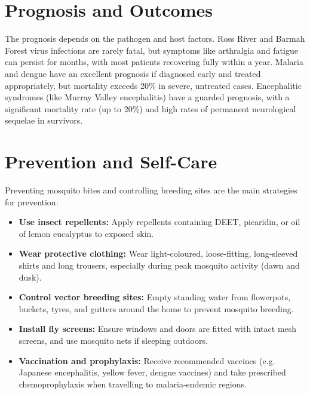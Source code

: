 \section*{Prognosis and Outcomes}
The prognosis depends on the pathogen and host factors. Ross River and Barmah Forest virus infections are rarely fatal, but symptoms like arthralgia and fatigue can persist for months, with most patients recovering fully within a year. Malaria and dengue have an excellent prognosis if diagnosed early and treated appropriately, but mortality exceeds 20\% in severe, untreated cases. Encephalitic syndromes (like Murray Valley encephalitis) have a guarded prognosis, with a significant mortality rate (up to 20\%) and high rates of permanent neurological sequelae in survivors.

\section*{Prevention and Self-Care}
Preventing mosquito bites and controlling breeding sites are the main strategies for prevention:
\begin{itemize}
    \item \textbf{Use insect repellents:} Apply repellents containing DEET, picaridin, or oil of lemon eucalyptus to exposed skin.
    \item \textbf{Wear protective clothing:} Wear light-coloured, loose-fitting, long-sleeved shirts and long trousers, especially during peak mosquito activity (dawn and dusk).
    \item \textbf{Control vector breeding sites:} Empty standing water from flowerpots, buckets, tyres, and gutters around the home to prevent mosquito breeding.
    \item \textbf{Install fly screens:} Ensure windows and doors are fitted with intact mesh screens, and use mosquito nets if sleeping outdoors.
    \item \textbf{Vaccination and prophylaxis:} Receive recommended vaccines (e.g. Japanese encephalitis, yellow fever, dengue vaccines) and take prescribed chemoprophylaxis when travelling to malaria-endemic regions.
\end{itemize}

